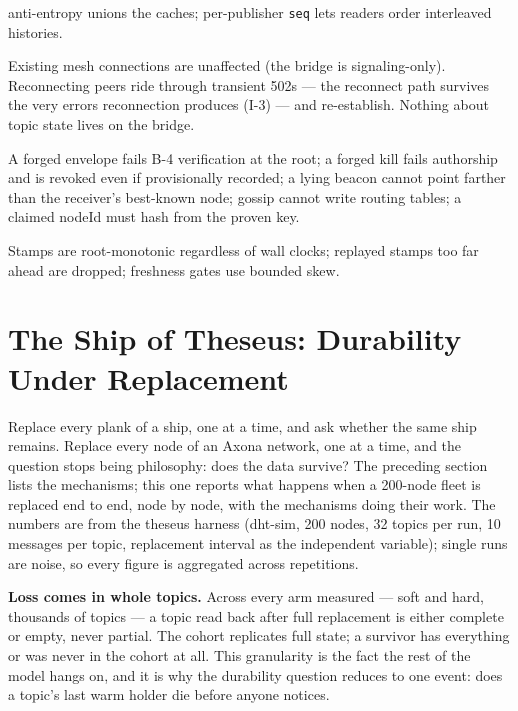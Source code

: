 \documentclass[nobib]{tufte-handout}
\begin{document}
\begin{description}
  anti-entropy unions the caches; per-publisher \texttt{seq} lets
  readers order interleaved histories.
\item[The bridge restarts.] Existing mesh connections are unaffected
  (the bridge is signaling-only). Reconnecting peers ride through
  transient 502s --- the reconnect path survives the very errors
  reconnection produces (I-3) --- and re-establish. Nothing about topic
  state lives on the bridge.
\item[A peer lies.] A forged envelope fails B-4 verification at the
  root; a forged kill fails authorship and is revoked even if
  provisionally recorded; a lying beacon cannot point farther than the
  receiver's best-known node; gossip cannot write routing tables; a
  claimed nodeId must hash from the proven key.
\item[Clocks are wrong.] Stamps are root-monotonic regardless of wall
  clocks; replayed stamps too far ahead are dropped; freshness gates use
  bounded skew.
\end{description}

\section{The Ship of Theseus: Durability Under Replacement}\label{sec:theseus}

Replace every plank of a ship, one at a time, and ask whether the same
ship remains. Replace every node of an Axona network, one at a time,
and the question stops being philosophy: does the data survive? The
preceding section lists the mechanisms; this one reports what happens
when a 200-node fleet is replaced end to end, node by node, with the
mechanisms doing their work. The numbers are from the theseus harness
(dht-sim, 200 nodes, 32 topics per run, 10 messages per topic,
replacement interval as the independent variable); single runs are
noise, so every figure is aggregated across repetitions.

\textbf{Loss comes in whole topics.} Across every arm measured --- soft
and hard, thousands of topics --- a topic read back after full
replacement is either complete or empty, never partial. The cohort
replicates full state; a survivor has everything or was never in the
cohort at all. This granularity is the fact the rest of the model
hangs on, and it is why the durability question reduces to one event:
does a topic's last warm holder die before anyone notices.
\end{document}
